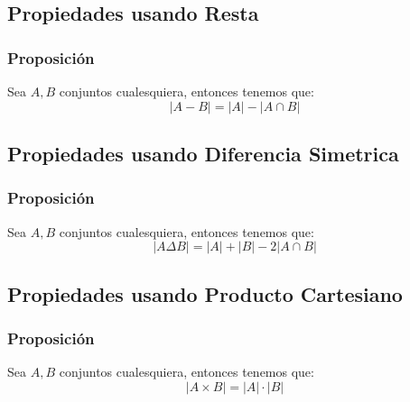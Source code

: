 \documentclass[12pt]{report}                                    %
\begin{document}
        \clearpage
        \subsection{Propiedades usando Resta}

            \subsubsection{Proposición}
                Sea $A, B$ conjuntos cualesquiera, entonces tenemos que:
                \begin{equation*}
                    |A - B| = |A| - |A \cap B|
                \end{equation*}


        \subsection{Propiedades usando Diferencia Simetrica}

            \subsubsection{Proposición}
                Sea $A, B$ conjuntos cualesquiera, entonces tenemos que:
                \begin{equation*}
                    |A \Delta B| = |A| + |B| - 2|A \cap B|
                \end{equation*}

        \clearpage
        \subsection{Propiedades usando Producto Cartesiano}

            \subsubsection{Proposición}
                Sea $A, B$ conjuntos cualesquiera, entonces tenemos que:
                \begin{equation*}
                    |A \times B| = |A| \cdot |B|
                \end{equation*}
\end{document}
